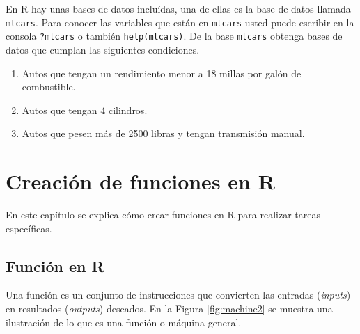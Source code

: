 \documentclass[10pt,]{krantz}
\providecommand{\tightlist}{%
  \setlength{\itemsep}{0pt}\setlength{\parskip}{0pt}}
\let\proglang=\textsf
\begin{document}
En \proglang{R} hay unas bases de datos incluídas, una de ellas es la
base de datos llamada \texttt{mtcars}. Para conocer las variables que
están en \texttt{mtcars} usted puede escribir en la consola
\texttt{?mtcars} o también \texttt{help(mtcars)}. De la base
\texttt{mtcars} obtenga bases de datos que cumplan las siguientes
condiciones.

\begin{enumerate}
\def\labelenumi{\arabic{enumi}.}
\setcounter{enumi}{21}
\tightlist
\item
  Autos que tengan un rendimiento menor a 18 millas por galón de
  combustible.
\item
  Autos que tengan 4 cilindros.
\item
  Autos que pesen más de 2500 libras y tengan transmisión manual.
\end{enumerate}

\chapter{\texorpdfstring{Creación de funciones en
\proglang{R}}{Creación de funciones en }}\label{creacion-de-funciones-en}

En este capítulo se explica cómo crear funciones en \proglang{R} para
realizar tareas específicas.

\section{\texorpdfstring{Función en \proglang{R}
}{Función en  }}\label{funcion-en}

Una función es un conjunto de instrucciones que convierten las entradas
(\emph{inputs}) en resultados (\emph{outputs}) deseados. En la Figura
\ref{fig:machine2} se muestra una ilustración de lo que es una función o
máquina general.
\end{document}
